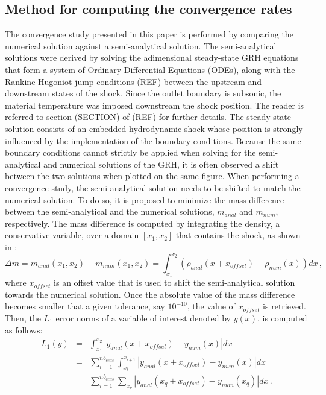 \documentclass[times,doublespace]{fldauth}%
\begin{document}
\subsection{Method for computing the convergence rates}\label{sec:mthd-conv-test}
%
The convergence study presented in this paper is performed by comparing the numerical solution against a semi-analytical solution. The semi-analytical solutions were derived by solving the adimensional steady-state GRH equations that form a system of Ordinary Differential Equations (ODEs), along with the Rankine-Hugoniot jump conditions (REF) between the upstream and downstream states of the shock. Since the outlet boundary is subsonic, the material temperature was imposed downstream the shock position. The reader is referred to section (SECTION) of (REF) for further details. The steady-state solution consists of an embedded hydrodynamic shock whose position is strongly influenced by the implementation of the boundary conditions. Because the same boundary conditions cannot strictly be applied when solving for the semi-analytical and numerical solutions of the GRH, it is often observed a shift between the two solutions when plotted on the same figure. When performing a convergence study, the semi-analytical solution needs to be shifted to match the numerical solution. To do so, it is proposed to minimize the mass difference between the semi-analytical and the numerical solutions, $m_{anal}$ and $m_{num}$, respectively. The mass difference is computed by integrating the density, a conservative variable, over a domain $[x_1, x_2]$ that contains the shock, as shown in :
%
\begin{equation}\label{eq:mass-diff}
\Delta m = m_{anal}(x_1,x_2) - m_{num}(x_1,x_2) = \int_{x_1}^{x_2} \left( \rho_{anal} (x+x_{offset}) - \rho_{num} (x)\right) dx \, ,
\end{equation}
%
where $x_{offset}$ is an offset value that is used to shift the semi-analytical solution towards the numerical solution. Once the absolute value of the mass difference becomes smaller that a given tolerance, say $10^{-10}$, the value of $x_{offset}$ is retrieved. Then, the $L_1$ error norms of a variable of interest denoted by $y(x)$, is computed as follows:
%
\begin{eqnarray}\label{eq:l1-error-norm}
L_1(y) &=& \int_{x_1}^{x_2} | y_{anal}(x+x_{offset}) - y_{num}(x) | dx \\ 
&=& \sum_{i=1}^{nb_{cells}} \int_{x_i}^{x_{i+1}} | y_{anal}(x+x_{offset}) - y_{num}(x) | dx \\
&=& \sum_{i=1}^{nb_{cells}} \sum_{x_q} | y_{anal}(x_q+x_{offset}) - y_{num}(x_q) | dx \, .
\end{eqnarray}
\end{document}
